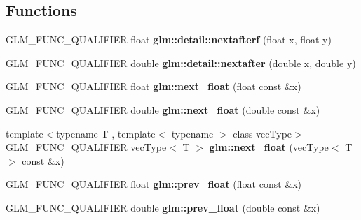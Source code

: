 \subsection*{Functions}
\begin{DoxyCompactItemize}
\item 
\hypertarget{namespaceglm_1_1detail_ab0eb795c482130b1d6c83470bdb031e6}{G\-L\-M\-\_\-\-F\-U\-N\-C\-\_\-\-Q\-U\-A\-L\-I\-F\-I\-E\-R float {\bfseries glm\-::detail\-::nextafterf} (float x, float y)}\label{namespaceglm_1_1detail_ab0eb795c482130b1d6c83470bdb031e6}

\item 
\hypertarget{namespaceglm_1_1detail_a3c14f8400407e8b4cff5be12ceef2c1e}{G\-L\-M\-\_\-\-F\-U\-N\-C\-\_\-\-Q\-U\-A\-L\-I\-F\-I\-E\-R double {\bfseries glm\-::detail\-::nextafter} (double x, double y)}\label{namespaceglm_1_1detail_a3c14f8400407e8b4cff5be12ceef2c1e}

\item 
\hypertarget{namespaceglm_ab8cb873dacaa59ccbef0ccb9e4361934}{G\-L\-M\-\_\-\-F\-U\-N\-C\-\_\-\-Q\-U\-A\-L\-I\-F\-I\-E\-R float {\bfseries glm\-::next\-\_\-float} (float const \&x)}\label{namespaceglm_ab8cb873dacaa59ccbef0ccb9e4361934}

\item 
\hypertarget{namespaceglm_a465f16ebf0c7afa44168fb1976e1ffce}{G\-L\-M\-\_\-\-F\-U\-N\-C\-\_\-\-Q\-U\-A\-L\-I\-F\-I\-E\-R double {\bfseries glm\-::next\-\_\-float} (double const \&x)}\label{namespaceglm_a465f16ebf0c7afa44168fb1976e1ffce}

\item 
\hypertarget{namespaceglm_abd36d974bf5f55a370accf62cd2bf01d}{{\footnotesize template$<$typename T , template$<$ typename $>$ class vec\-Type$>$ }\\G\-L\-M\-\_\-\-F\-U\-N\-C\-\_\-\-Q\-U\-A\-L\-I\-F\-I\-E\-R vec\-Type$<$ T $>$ {\bfseries glm\-::next\-\_\-float} (vec\-Type$<$ T $>$ const \&x)}\label{namespaceglm_abd36d974bf5f55a370accf62cd2bf01d}

\item 
\hypertarget{namespaceglm_a1fd407652d7ccfbe810674a2e5cbc8eb}{G\-L\-M\-\_\-\-F\-U\-N\-C\-\_\-\-Q\-U\-A\-L\-I\-F\-I\-E\-R float {\bfseries glm\-::prev\-\_\-float} (float const \&x)}\label{namespaceglm_a1fd407652d7ccfbe810674a2e5cbc8eb}

\item 
\hypertarget{namespaceglm_a82cdd5674b80569f118b33a6a327c9bd}{G\-L\-M\-\_\-\-F\-U\-N\-C\-\_\-\-Q\-U\-A\-L\-I\-F\-I\-E\-R double {\bfseries glm\-::prev\-\_\-float} (double const \&x)}\label{namespaceglm_a82cdd5674b80569f118b33a6a327c9bd}


\end{DoxyCompactItemize}
